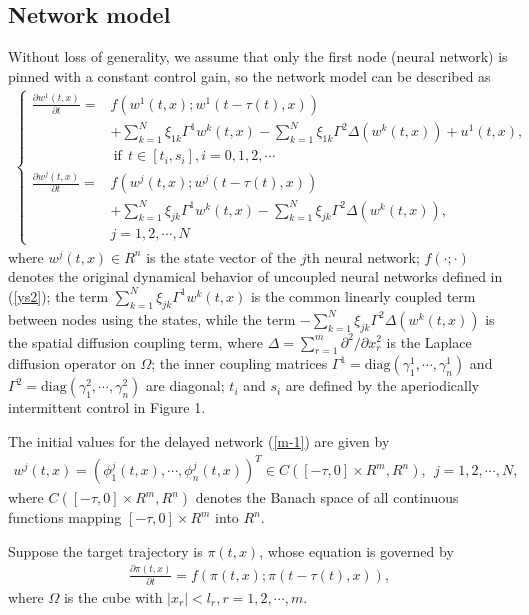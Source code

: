 \documentclass[review]{elsarticle}
\begin{document}
\subsection{Network model}
Without loss of generality, we assume that only
the first node (neural network) is pinned with a constant control gain, so the network model can be described as
\begin{align}\label{m-1}
\left\{
\begin{array}{cl}
\frac{\partial{w^1(t,x)}}{\partial{t}}=&f(w^1(t,x);w^1(t-\tau(t),x))\\
&+\sum\limits_{k=1}^N\xi_{1k}\Gamma^1
w^k(t,x)-\sum\limits_{k=1}^N\xi_{1k}\Gamma^2
\Delta(w^k(t,x))+u^1(t,x),\\
&~\mathrm{if}~~t\in [t_i,s_i], i=0,1,2,\cdots\\
\frac{\partial{w^j(t,x)}}{\partial{t}}=&f(w^j(t,x);w^j(t-\tau(t),x))\\
&+\sum\limits_{k=1}^N\xi_{jk}\Gamma^1
w^k(t,x)-\sum\limits_{k=1}^N\xi_{jk}\Gamma^2
\Delta(w^k(t,x)),\\
&j=1,2,\cdots,N
\end{array}
\right.
\end{align}
where $w^j(t,x)\in R^n$ is the state vector of the $j$th neural network; $f(\cdot;\cdot)$ denotes the original dynamical behavior of uncoupled neural networks defined in (\ref{ys2}); the term $\sum\limits_{k=1}^N\xi_{jk}\Gamma^1
w^k(t,x)$ is the common linearly coupled term between nodes using the states, while the term $-\sum\limits_{k=1}^N\xi_{jk}\Gamma^2
\Delta(w^k(t,x))$ is the spatial diffusion coupling term, where $\Delta=\sum_{r=1}^m{\partial^2}/{\partial{x_r^2}}$ is the Laplace diffusion operator on $\Omega$; the inner coupling matrices $\Gamma^1=\mathrm{diag}(\gamma_1^1,\cdots,\gamma_n^1)$ and $\Gamma^2=\mathrm{diag}(\gamma_1^2,\cdots,\gamma_n^2)$ are diagonal; $t_i$ and $s_i$ are defined by the aperiodically intermittent control in Figure 1.

The initial values for the delayed network (\ref{m-1}) are given by
\begin{align*}
w^j(t,x)=(\phi^j_1(t,x),\cdots,\phi^j_n(t,x))^T\in C([-{\tau},0]\times R^m,R^n), ~~j=1,2,\cdots,N,
\end{align*}
where $C([-{\tau},0]\times R^m,R^n)$ denotes the Banach space of all continuous functions mapping $[-{\tau}, 0]\times R^m$ into $R^n$.

Suppose the target trajectory is $\pi(t,x)$, whose equation is governed by
\begin{align}\label{origin}
\frac{\partial{\pi}(t,x)}{\partial{t}}=f(\pi(t,x);\pi(t-\tau(t),x)),
\end{align}
where $\Omega$ is the cube with $|x_r|<l_r, r=1,2,\cdots,m$.
\end{document}
